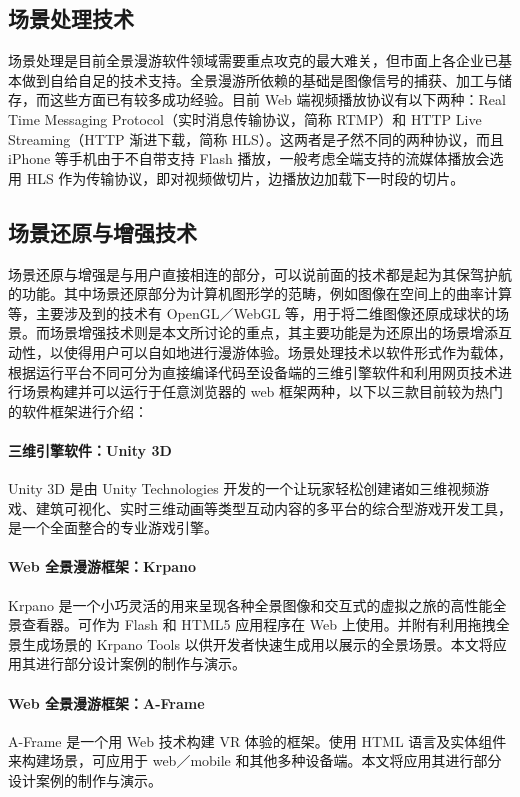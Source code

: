 \subsection{场景处理技术}
场景处理是目前全景漫游软件领域需要重点攻克的最大难关，但市面上各企业已基本做到自给自足的技术支持。全景漫游所依赖的基础是图像信号的捕获、加工与储存，而这些方面已有较多成功经验。目前 Web 端视频播放协议有以下两种：Real Time Messaging Protocol（实时消息传输协议，简称 RTMP）和 HTTP Live Streaming（HTTP 渐进下载，简称 HLS）。这两者是孑然不同的两种协议，而且 iPhone 等手机由于不自带支持 Flash 播放，一般考虑全端支持的流媒体播放会选用 HLS 作为传输协议，即对视频做切片，边播放边加载下一时段的切片。

\subsection{场景还原与增强技术}
场景还原与增强是与用户直接相连的部分，可以说前面的技术都是起为其保驾护航的功能。其中场景还原部分为计算机图形学的范畴，例如图像在空间上的曲率计算等，主要涉及到的技术有 OpenGL／WebGL 等，用于将二维图像还原成球状的场景。而场景增强技术则是本文所讨论的重点，其主要功能是为还原出的场景增添互动性，以使得用户可以自如地进行漫游体验。场景处理技术以软件形式作为载体，根据运行平台不同可分为直接编译代码至设备端的三维引擎软件和利用网页技术进行场景构建并可以运行于任意浏览器的 web 框架两种，以下以三款目前较为热门的软件框架进行介绍：

\paragraph{三维引擎软件：Unity 3D}

Unity 3D 是由 Unity Technologies 开发的一个让玩家轻松创建诸如三维视频游戏、建筑可视化、实时三维动画等类型互动内容的多平台的综合型游戏开发工具，是一个全面整合的专业游戏引擎。

\paragraph{Web 全景漫游框架：Krpano}
Krpano 是一个小巧灵活的用来呈现各种全景图像和交互式的虚拟之旅的高性能全景查看器。可作为 Flash 和 HTML5 应用程序在 Web 上使用。并附有利用拖拽全景生成场景的 Krpano Tools 以供开发者快速生成用以展示的全景场景。本文将应用其进行部分设计案例的制作与演示。

\paragraph{Web 全景漫游框架：A-Frame}
A-Frame 是一个用 Web 技术构建 VR 体验的框架。使用 HTML 语言及实体组件来构建场景，可应用于 web／mobile 和其他多种设备端。本文将应用其进行部分设计案例的制作与演示。

